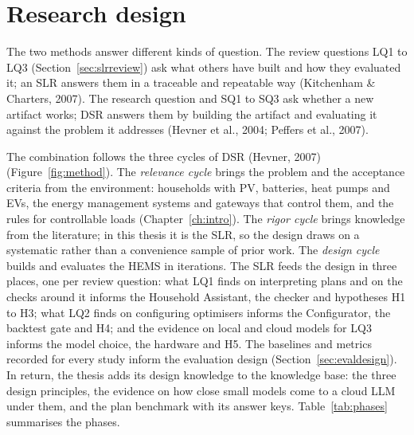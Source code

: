 \documentclass[12pt,a4paper]{report}
\begin{document}
\section{Research design}
\label{sec:design}

The two methods answer different kinds of question. The review questions
LQ1 to LQ3 (Section~\ref{sec:slrreview}) ask what others have built and
how they evaluated it; an SLR answers them in a traceable and repeatable
way (Kitchenham \& Charters, 2007). The research question and SQ1 to SQ3
ask whether a new artifact works; DSR answers them by building the
artifact and evaluating it against the problem it addresses
(Hevner et al., 2004; Peffers et al., 2007).

The combination follows the three cycles of DSR (Hevner, 2007)
(Figure~\ref{fig:method}). The \textit{relevance cycle} brings the
problem and the acceptance criteria from the environment: households
with PV, batteries, heat pumps and EVs, the energy management systems
and gateways that control them, and the rules for controllable loads
(Chapter~\ref{ch:intro}). The
\textit{rigor cycle} brings knowledge from the literature; in this
thesis it is the SLR, so the design draws on a systematic rather than
a convenience sample of prior work. The \textit{design cycle} builds and
evaluates the HEMS in iterations. The SLR feeds the design in three
places, one per review question: what LQ1 finds on interpreting plans
and on the checks around it informs the Household Assistant, the
checker and hypotheses H1 to H3; what LQ2 finds on configuring
optimisers informs the Configurator, the backtest gate and H4; and the
evidence on local and cloud models for LQ3 informs the model choice,
the hardware and H5. The baselines and metrics recorded for every study
inform the evaluation design (Section~\ref{sec:evaldesign}). In return,
the thesis adds its design knowledge to the knowledge base: the three
design principles, the evidence on how close small models come to a
cloud LLM under them, and the plan benchmark with its answer keys.
Table~\ref{tab:phases} summarises the phases.
\end{document}
